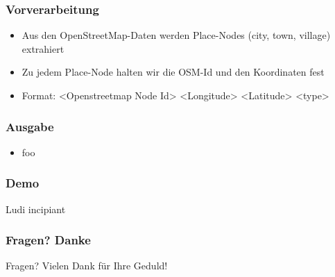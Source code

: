 \documentclass{beamer}
\begin{document}
\begin{frame}
    \frametitle{Vorverarbeitung}
    \begin{itemize}
        \item Aus den OpenStreetMap-Daten werden Place-Nodes (city, town, village) extrahiert
        \item Zu jedem Place-Node halten wir die OSM-Id und den Koordinaten fest
        \item Format: <Openstreetmap Node Id> <Longitude> <Latitude> <type>
    \end{itemize}
\end{frame}

\begin{frame}
    \frametitle{Ausgabe}
    \begin{itemize}
        \item foo
    \end{itemize}
\end{frame}

\begin{frame}
    \frametitle{Demo}
    \begin{center}
        Ludi incipiant
    \end{center}
\end{frame}

\begin{frame}
    \frametitle{Fragen? Danke}
    \begin{center}
    Fragen?
    \newline Vielen Dank für Ihre Geduld!
    \end{center}
\end{frame}
\end{document}
